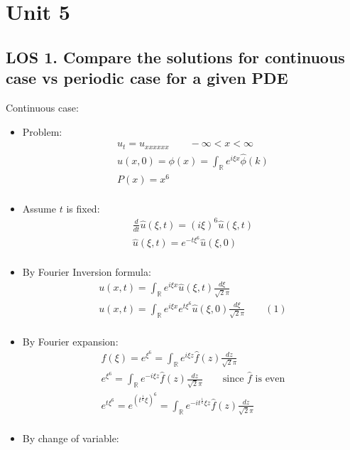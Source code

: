\documentclass[12pt, a4paper]{article}
\begin{document}
\section*{Unit 5}
\vspace{1em}

\subsection*{LOS 1. Compare the solutions for continuous case vs periodic case for a given PDE}
Continuous case:
\begin{itemize}
    \item Problem: 
    \begin{gather*}
        u_t = u_{xxxxxx} \qquad -\infty < x < \infty\\
        u(x, 0) = \phi(x) = \int_{\mathbb{R}} e^{i\xi x}\hat{\phi}(k)\\
        P(x) = x^6\\
    \end{gather*}
    \item Assume $t$ is fixed:
    \begin{gather*}
        \frac{d}{dt} \hat{u}(\xi, t) =(i\xi)^6\hat{u}({\xi, t}) \\
        \hat{u}(\xi, t) = e^{-t\xi^6}\hat{u}(\xi, 0) \\
    \end{gather*}
    \item By Fourier Inversion formula:
    \begin{gather*}
        u(x, t) = \int_{\mathbb{R}} e^{i\xi x}\hat{u}(\xi, t)\frac{d\xi}{\sqrt{2}\pi}\\
        u(x, t) = \int_{\mathbb{R}} e^{i\xi x}e^{t\xi^6}\hat{u}(\xi, 0)\frac{d\xi}{\sqrt{2}\pi} \qquad (1)\\
    \end{gather*}
    \item By Fourier expansion:
    \begin{gather*}
        f(\xi) = e^{\xi^6} = \int_{\mathbb{R}} e^{i\xi z}\hat{f}(z)\frac{dz}{\sqrt{2}\pi}\\
        e^{\xi^6} = \int_{\mathbb{R}} e^{-i\xi z}\hat{f}(z)\frac{dz}{\sqrt{2}\pi} \qquad \text{since $\hat{f}$ is even}\\
        e^{t\xi^6} = e^{(t^{\frac{1}{6}}\xi)^6} = \int_{\mathbb{R}} e^{-it^{\frac{1}{6}}\xi z}\hat{f}(z)\frac{dz}{\sqrt{2}\pi}\\
    \end{gather*}
    \item By change of variable:

\end{itemize}
\end{document}
